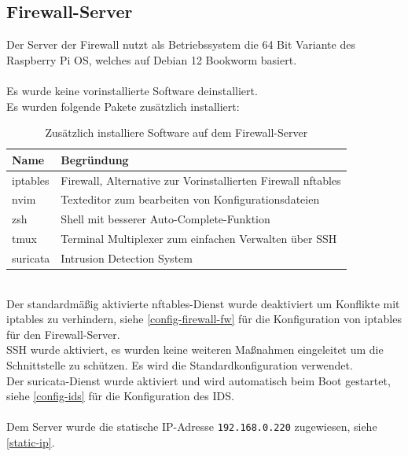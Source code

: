 \documentclass[
    a4paper,
    pagesize,
	pdftex,
    12pt,
]{scrartcl}
\begin{document}
\subsection{Firewall-Server}
Der Server der Firewall nutzt als Betriebssystem die 64 Bit Variante des Raspberry Pi OS, welches auf Debian 12 Bookworm basiert. \\ \\
Es wurde keine vorinstallierte  Software deinstalliert. \\
Es wurden folgende Pakete zusätzlich installiert:
\begin{table}[h!]
	\begin{center}
		\label{tab:table1}
		\begin{tabular}{l|l }
			\textbf{Name} & \textbf{Begründung} \\
			\hline
			iptables & Firewall, Alternative zur Vorinstallierten Firewall nftables \\
			nvim & Texteditor zum bearbeiten von Konfigurationsdateien \\
			zsh & Shell mit besserer Auto-Complete-Funktion \\
			tmux & Terminal Multiplexer zum einfachen Verwalten über SSH \\
			suricata & Intrusion Detection System \\
		\end{tabular}
		\caption{Zusätzlich installiere Software auf dem Firewall-Server}
	\end{center}
\end{table}
\\
Der standardmäßig aktivierte nftables-Dienst wurde deaktiviert um Konflikte mit iptables zu verhindern, siehe  \ref{config-firewall-fw} für die Konfiguration von iptables für den Firewall-Server. \\
SSH wurde aktiviert, es wurden keine weiteren Maßnahmen eingeleitet um die Schnittstelle zu  schützen. Es wird die Standardkonfiguration verwendet. \\
Der suricata-Dienst wurde aktiviert und wird automatisch beim Boot gestartet, siehe  \ref{config-ids} für die Konfiguration des IDS. \\ \\
Dem Server wurde die statische IP-Adresse \lstinline[breaklines]|192.168.0.220| zugewiesen, siehe  \ref{static-ip}.

\newpage
\end{document}
